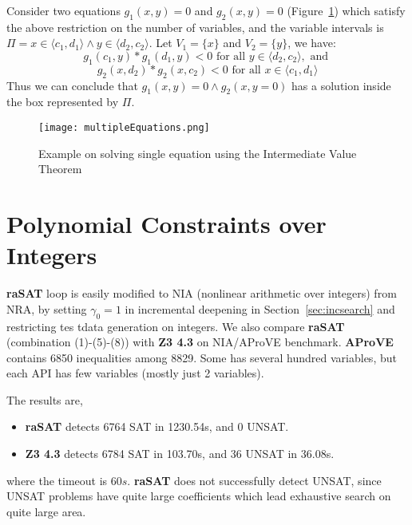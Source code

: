 \begin{example}
Consider two equations $g_1(x, y)=0$ and $g_2(x, y) = 0$ (Figure~\ref{fig:multiple-equations}) which satisfy the above restriction on the number of variables, and the variable intervals is $\Pi = x \in \langle c_1, d_1 \rangle \wedge y \in \langle d_2, c_2 \rangle$. Let $V_1 = \{x\}$ and $V_2 = \{y\}$, we have:
\[g_1(c_1, y)*g_1(d_1, y) < 0 \text{ for all } y \in \langle d_2, c_2 \rangle, \text{ and }\]
\[g_2(x, d_2)*g_2(x, c_2) < 0 \text{ for all } x \in \langle c_1, d_1 \rangle\]
Thus we can conclude that $g_1(x,y)=0 \wedge g_2(x,y=0)$ has a solution inside the box represented by $\Pi$.
\end{example}
\begin{figure}[ht]
\centering
\texttt{[image: multipleEquations.png]} 
\caption{Example on solving single equation using the Intermediate Value Theorem} 
\label{fig:multiple-equations} 
\end{figure}

\section{Polynomial Constraints over Integers} \label{sec:NIA}

{\bf raSAT} loop is easily modified to NIA (nonlinear arithmetic over integers) from NRA, 
by setting $\gamma_0 = 1$ in incremental deepening in Section~\ref{sec:incsearch} 
and restricting tes tdata generation on integers. 
We also compare {\bf raSAT} (combination (1)-(5)-(8)) with {\bf Z3 4.3} on NIA/AProVE benchmark. 
{\bf AProVE} contains 6850 inequalities among 8829. 
Some has several hundred variables, but each API has few variables (mostly just 2 variables). 

The results are, 
\begin{itemize}
\item {\bf raSAT} detects 6764 SAT in 1230.54s, and 0 UNSAT. 
\item {\bf Z3 4.3} detects 6784 SAT in 103.70s, and 36 UNSAT in 36.08s. 
\end{itemize}
where the timeout is $60s$. 
{\bf raSAT} does not successfully detect UNSAT, since UNSAT problems have quite large coefficients
which lead exhaustive search on quite large area. 

